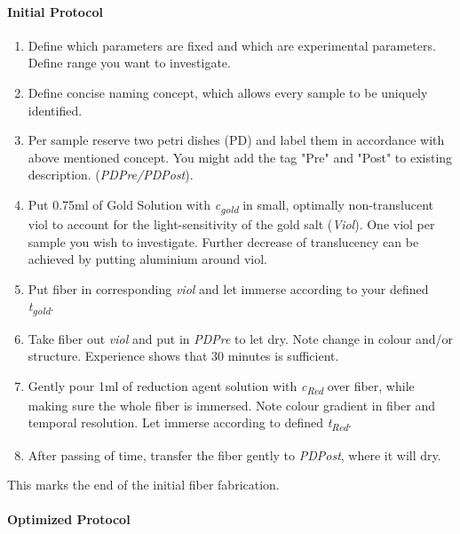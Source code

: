 \begin{appendices}
\paragraph{Initial Protocol}

\begin{enumerate}
	\item Define which parameters are fixed and which are experimental parameters. Define range you want to investigate.
	
	\item Define concise naming concept, which allows every sample to be uniquely identified.
	
	\item Per sample reserve two petri dishes (PD) and label them in accordance with above mentioned concept. You might add the tag "Pre" and "Post" to existing description. (\textit{PDPre/PDPost}).
	
	\item Put 0.75ml of Gold Solution with \textit{c\textsubscript{gold}} in small, optimally non-translucent viol to account for the light-sensitivity of the gold salt (\textit{Viol}). One viol per sample you wish to investigate. Further decrease of translucency can be achieved by putting aluminium around viol.
	
	\item Put fiber in corresponding \textit{viol} and let immerse according to your defined \textit{t\textsubscript{gold}}.
	\item Take fiber out \textit{viol} and put in \textit{PDPre} to let dry. Note change in colour and/or structure. Experience shows that 30 minutes is sufficient.
	
	\item Gently pour 1ml of reduction agent solution with \textit{c\textsubscript{Red}} over fiber, while making sure the whole fiber is immersed. Note colour gradient in fiber and temporal resolution. Let immerse according to defined \textit{t\textsubscript{Red}}.
	
	\item After passing of time, transfer the fiber gently to \textit{PDPost}, where it will dry.
\end{enumerate}

\begin{center}
	This marks the end of the initial fiber fabrication.
\end{center}


\paragraph{Optimized Protocol} \hfill\newline


\end{appendices}
